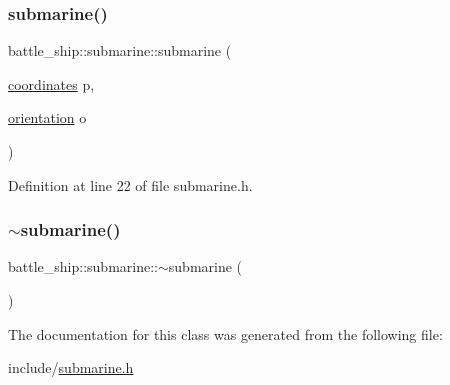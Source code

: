 \mbox{\label{classbattle__ship_1_1submarine_a229d0577e45bd964f4d32b50506c9504}} 
\subsubsection{\texorpdfstring{submarine()}{submarine()}\hspace{0.1cm}{\footnotesize\ttfamily [2/2]}}
{\footnotesize\ttfamily battle\+\_\+ship\+::submarine\+::submarine (\begin{DoxyParamCaption}\item[{\hyperlink{structbattle__ship_1_1coordinates}{coordinates}}]{p,  }\item[{\hyperlink{namespacebattle__ship_aed87488f0a73f0d0679fe343fb61c784}{orientation}}]{o }\end{DoxyParamCaption})\hspace{0.3cm}{\ttfamily [inline]}}



Definition at line 22 of file submarine.\+h.

\mbox{\label{classbattle__ship_1_1submarine_a03b3a1b0c62de507e2b3a4d9ec1de06f}} 
\subsubsection{\texorpdfstring{$\sim$submarine()}{~submarine()}}
{\footnotesize\ttfamily battle\+\_\+ship\+::submarine\+::$\sim$submarine (\begin{DoxyParamCaption}{ }\end{DoxyParamCaption})\hspace{0.3cm}{\ttfamily [default]}}



The documentation for this class was generated from the following file\+:\begin{DoxyCompactItemize}
\item 
include/\hyperlink{submarine_8h}{submarine.\+h}\end{DoxyCompactItemize}
